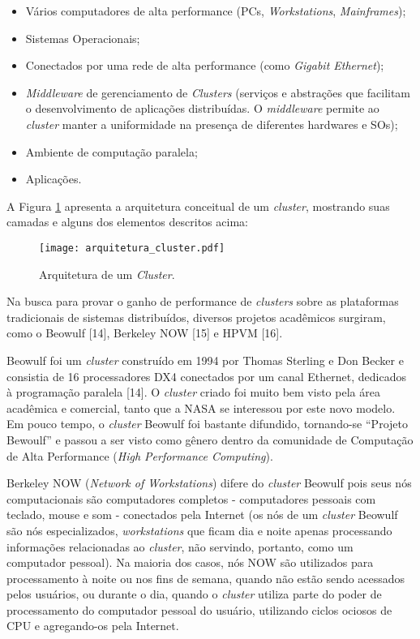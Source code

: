 \begin{itemize}
    \item Vários computadores de alta performance (PCs, \textit{Workstations}, \textit{Mainframes});
    \item Sistemas Operacionais;
    \item Conectados por uma rede de alta performance (como \textit{Gigabit Ethernet});
    \item \textit{Middleware} de gerenciamento de \textit{Clusters} (serviços e abstrações que facilitam o desenvolvimento de aplicações distribuídas. O \textit{middleware} permite ao \textit{cluster} manter a uniformidade na presença de diferentes hardwares e SOs);
    \item Ambiente de computação paralela;
    \item Aplicações.
\end{itemize}

A Figura \ref{fig:cluster_architecture} apresenta a arquitetura conceitual de um \textit{cluster}, mostrando suas camadas e alguns dos elementos descritos acima:

\begin{figure}[H]
	\centering
	\texttt{[image: arquitetura\_cluster.pdf]}
	\caption{Arquitetura de um \textit{Cluster}.}
	\label{fig:cluster_architecture}
\end{figure}

Na busca para provar o ganho de performance de \textit{clusters} sobre as plataformas tradicionais de sistemas distribuídos, diversos projetos acadêmicos surgiram, como o Beowulf [14], Berkeley NOW [15] e HPVM [16].

Beowulf foi um \textit{cluster} construído em 1994 por Thomas Sterling e Don Becker e consistia de 16 processadores DX4 conectados por um canal Ethernet, dedicados à programação paralela [14]. O \textit{cluster} criado foi muito bem visto pela área acadêmica e comercial, tanto que a NASA se interessou por este novo modelo. Em pouco tempo, o \textit{cluster} Beowulf foi bastante difundido, tornando-se “Projeto Bewoulf” e passou a ser visto como gênero dentro da comunidade de Computação de Alta Performance (\textit{High Performance Computing}).

Berkeley NOW (\textit{Network of Workstations}) difere do \textit{cluster} Beowulf pois seus nós computacionais são computadores completos - computadores pessoais com teclado, mouse e som - conectados pela Internet (os nós de um \textit{cluster} Beowulf são nós especializados, \textit{workstations} que ficam dia e noite apenas processando informações relacionadas ao \textit{cluster}, não servindo, portanto, como um computador pessoal). Na maioria dos casos, nós NOW são utilizados para processamento à noite ou nos fins de semana, quando não estão sendo acessados pelos usuários, ou durante o dia, quando o \textit{cluster} utiliza parte do poder de processamento do computador pessoal do usuário, utilizando ciclos ociosos de CPU e agregando-os pela Internet. 

